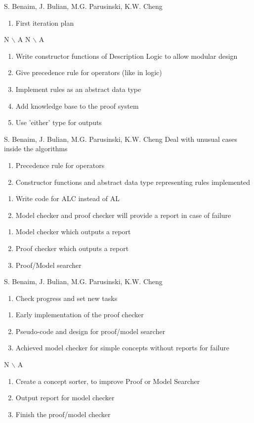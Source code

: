 %
{S. Benaim, J. Bulian, M.G. Parusinski, K.W. Cheng}%
{ \begin{enumerate} 
  \item First iteration plan
\end{enumerate} }%
{ N $\backslash$ A}%
{N $\backslash$ A}
{\begin{enumerate}
\item Write constructor functions of Description Logic to allow modular design
\item Give precedence rule for operators (like in logic)
\item Implement rules as an abstract data type
\item Add knowledge base to the proof system
\item Use 'either' type for outputs
\end{enumerate}}%

%
{S. Benaim, J. Bulian, M.G. Parusinski, K.W. Cheng}%
{Deal with unusual cases inside the algorithms}%
{\begin{enumerate}
\item Precedence rule for operators
\item Constructor functions and abstract data type representing rules implemented
\end{enumerate}}%
{\begin{enumerate}
\item Write code for ALC instead of AL
\item Model checker and proof checker will provide a report in case of failure
\end{enumerate}}
{\begin{enumerate}
\item Model checker which outputs a report
\item Proof checker which outputs a report
\item Proof/Model searcher
\end{enumerate}}%

%
{S. Benaim, J. Bulian, M.G. Parusinski, K.W. Cheng}%
{\begin{enumerate} 
\item  Check progress and set new tasks
\end{enumerate} }%
{\begin{enumerate}
\item Early implementation of the proof checker
\item Pseudo-code and design for proof/model searcher
\item Achieved model checker for simple concepts without reports for failure
\end{enumerate}}%
{N $\backslash$ A}
{\begin{enumerate}
\item Create a concept sorter, to improve Proof or Model Searcher
\item Output report for model checker
\item Finish the proof/model checker
\end{enumerate}}%

